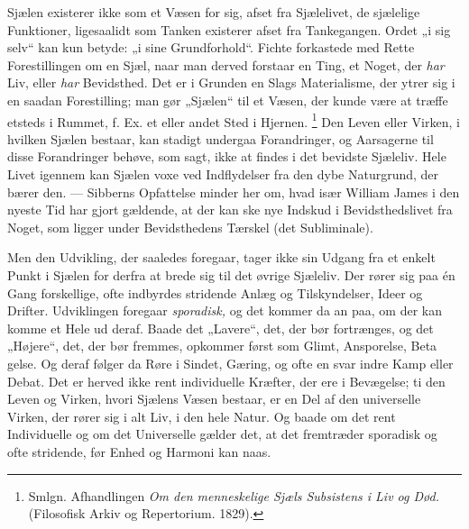 \documentclass[12pt,a4paper,openany]{book}
\newcommand{\opage}[1]{\marginnote{\footnotesize\textit{[#1]}}}
\begin{document}
Sjælen existerer ikke som et Væsen for sig, afset fra Sjælelivet, de sjælelige
Funktioner, ligesaalidt som Tanken existerer afset fra Tankegangen. Ordet „i
sig selv“ kan kun betyde: „i sine Grundforhold“. Fichte forkastede med Rette
Forestillingen om en Sjæl, naar man derved forstaar en Ting, et Noget, der
\textit{har} Liv, eller \textit{har} Bevidsthed. Det er i Grunden en Slags
Materialisme, der ytrer sig i en saadan Forestilling; man gør „Sjælen“ til et
Væsen, der kunde være at træffe etsteds i Rummet, f. Ex. et eller andet Sted i
Hjernen.%
\footnote[1]{Smlgn. Afhandlingen \textit{Om den menneskelige Sjæls Subsistens i
Liv og Død.} (Filosofisk Arkiv og Repertorium. 1829).} Den Leven eller Virken,
i hvilken Sjælen bestaar, kan stadigt undergaa Forandringer, og Aarsagerne til
disse Forandringer behøve, som sagt, ikke at findes i det bevidste Sjæleliv.
Hele Livet igennem kan Sjælen voxe ved Indflydelser fra den dybe Naturgrund,
der bærer den. --- Sibberns Opfattelse minder her om, hvad især William James i
den nyeste Tid har gjort gældende, at der kan ske nye Indskud i
Bevidsthedslivet fra Noget, som ligger under Bevidsthedens Tærskel (det Subliminale).

Men den Udvikling, der saaledes foregaar, tager ikke sin Udgang fra et enkelt
Punkt i Sjælen for derfra at brede sig til det øvrige Sjæleliv. Der rører sig
paa én Gang forskellige, ofte indbyrdes stridende Anlæg og Tilskyndelser, Ideer
og Drifter. Udviklingen foregaar \textit{sporadisk,} og det kommer da an paa,
om der kan komme et Hele ud deraf. Baade det „Lavere“, det, der bør fortrænges,
og det „Højere“, det, der bør fremmes, opkommer først som Glimt, Ansporelse, Beta%
\setcounter{footnote}{0}%
\opage{101}gelse. Og deraf følger da Røre i Sindet, Gæring, og ofte en svar
indre Kamp eller Debat. Det er herved ikke rent individuelle Kræfter, der ere i
Bevægelse; ti den Leven og Virken, hvori Sjælens Væsen bestaar, er en Del af
den universelle Virken, der rører sig i alt Liv, i den hele Natur. Og baade om
det rent Individuelle og om det Universelle gælder det, at det fremtræder
sporadisk og ofte stridende, før Enhed og Harmoni kan naas.
\end{document}
